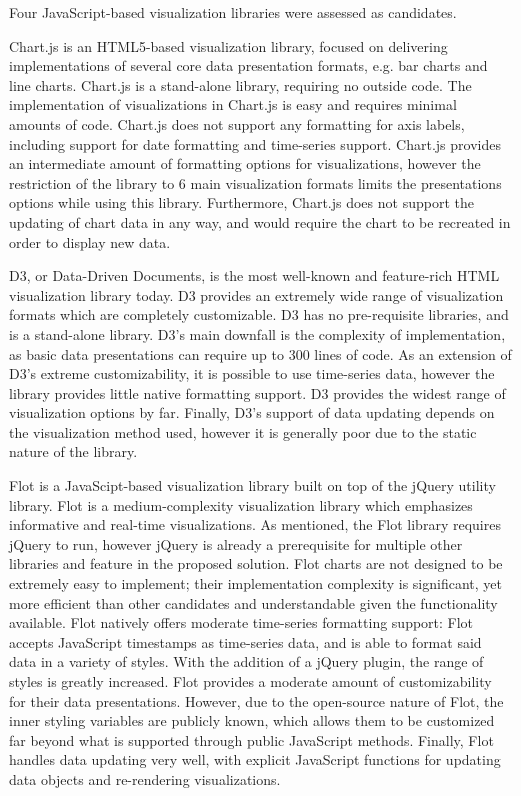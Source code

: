 \documentclass{report}
\begin{document}
Four JavaScript-based visualization libraries were assessed as candidates.

Chart.js is an HTML5-based visualization library, focused on delivering implementations of several core data presentation formats, e.g. bar charts and line charts. Chart.js is a stand-alone library, requiring no outside code. The implementation of visualizations in Chart.js is easy and requires minimal amounts of code. Chart.js does not support any formatting for axis labels, including support for date formatting and time-series support. Chart.js provides an intermediate amount of formatting options for visualizations, however the restriction of the library to 6 main visualization formats limits the presentations options while using this library. Furthermore, Chart.js does not support the updating of chart data in any way, and would require the chart to be recreated in order to display new data.

D3, or Data-Driven Documents, is the most well-known and feature-rich HTML visualization library today. D3 provides an extremely wide range of visualization formats which are completely customizable. D3 has no pre-requisite libraries, and is a stand-alone library. D3's main downfall is the complexity of implementation, as basic data presentations can require up to 300 lines of code. As an extension of D3's extreme customizability, it is possible to use time-series data, however the library provides little native formatting support. D3 provides the widest range of visualization options by far. Finally, D3's support of data updating depends on the visualization method used, however it is generally poor due to the static nature of the library.

Flot is a JavaScipt-based visualization library built on top of the jQuery utility library. Flot is a medium-complexity visualization library which emphasizes informative and real-time visualizations. As mentioned, the Flot library requires jQuery to run, however jQuery is already a prerequisite for multiple other libraries and feature in the proposed solution. Flot charts are not designed to be extremely easy to implement; their implementation complexity is significant, yet more efficient than other candidates and understandable given the functionality available. Flot natively offers moderate time-series formatting support: Flot accepts JavaScript timestamps as time-series data, and is able to format said data in a variety of styles. With the addition of a jQuery plugin, the range of styles is greatly increased. Flot provides a moderate amount of customizability for their data presentations. However, due to the open-source nature of Flot, the inner styling variables are publicly known, which allows them to be customized far beyond what is supported through public JavaScript methods. Finally, Flot handles data updating very well, with explicit JavaScript functions for updating data objects and re-rendering visualizations.
\end{document}
